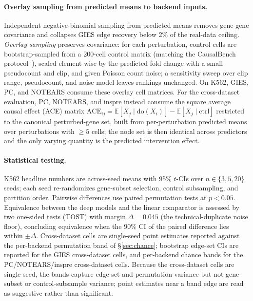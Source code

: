 \documentclass{article}
\theoremstyle{plain}
\theoremstyle{definition}
\theoremstyle{remark}
\begin{document}
\paragraph{Overlay sampling from predicted means to backend inputs.} Independent negative-binomial sampling from predicted means removes gene-gene covariance and collapses GIES edge recovery below 2\% of the real-data ceiling. \emph{Overlay sampling} preserves covariance: for each perturbation, control cells are bootstrap-sampled from a 200-cell control matrix (matching the CausalBench protocol~\citep{chevalley2025causalbench}), scaled element-wise by the predicted fold change with a small pseudocount and clip, and given Poisson count noise; a sensitivity sweep over clip range, pseudocount, and noise model leaves rankings unchanged. On K562, GIES, PC, and NOTEARS consume these overlay cell matrices. For the cross-dataset evaluation, PC, NOTEARS, and inspre instead consume the square average causal effect (ACE) matrix $\mathrm{ACE}_{ij}=\mathbb{E}[X_j\mid\mathrm{do}(X_i)]-\mathbb{E}[X_j\mid\mathrm{ctrl}]$ restricted to the canonical perturbed-gene set, built from per-perturbation predicted means over perturbations with $\geq 5$ cells; the node set is then identical across predictors and the only varying quantity is the predicted intervention effect.

\paragraph{Statistical testing.} K562 headline numbers are across-seed means with 95\% $t$-CIs over $n\in\{3,5,20\}$ seeds; each seed re-randomizes gene-subset selection, control subsampling, and partition order. Pairwise differences use paired permutation tests at $p<0.05$. Equivalence between the deep models and the linear comparator is assessed by two one-sided tests (TOST) with margin $\Delta = 0.045$ (the technical-duplicate noise floor), concluding equivalence when the $90\%$ CI of the paired difference lies within $\pm\Delta$. Cross-dataset cells are single-seed point estimates reported against the per-backend permutation band of \S\ref{sec:chance}; bootstrap edge-set CIs are reported for the GIES cross-dataset cells, and per-backend chance bands for the PC/NOTEARS/inspre cross-dataset cells. Because the cross-dataset cells are single-seed, the bands capture edge-set and permutation variance but not gene-subset or control-subsample variance; point estimates near a band edge are read as suggestive rather than significant.
\end{document}
